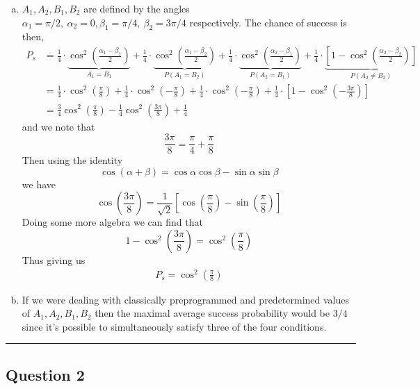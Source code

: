 \documentclass[11pt]{article}
\begin{document}
\begin{enumerate}[(a).]
  \item $A_1, A_2, B_1, B_2$ are defined by the angles $\alpha_1 = \pi/2, ~\alpha_2 = 0, \beta_1 = \pi/4, ~\beta_2 = 3\pi/4$ respectively. The chance of success is then,
  \begin{align*}
    P_s &= \frac{1}{4} \cdot \underbrace{\cos^2\left(\frac{\alpha_1 - \beta_1}{2}\right)}_{A_1 = B_1} + \frac{1}{4} \cdot \underbrace{ \cos^2\left(\frac{\alpha_1 - \beta_2}{2}\right)}_{P(A_1 = B_2)} + \frac{1}{4} \cdot \underbrace{\cos^2\left(\frac{\alpha_2 - \beta_1}{2}\right)}_{P(A_2 = B_1)} + \frac{1}{4} \cdot \underbrace{\left[1 - \cos^2\left(\frac{\alpha_2 - \beta_2}{2}\right)\right]}_{P(A_2 \neq B_2)} \\
    &= \frac{1}{4} \cdot \cos^2\left(\frac{\pi}{8}\right) + \frac{1}{4} \cdot \cos^2\left(-\frac{\pi}{8}\right) + \frac{1}{4} \cdot \cos^2\left(-\frac{\pi}{8}\right) + \frac{1}{4} \cdot \left[1 - \cos^2\left(-\frac{3\pi}{8}\right)\right] \\
    &= \frac{3}{4} \cos^2\left(\frac{\pi}{8}\right) - \frac{1}{4} \cos^2\left(\frac{3\pi}{8}\right) + \frac{1}{4}
  \end{align*} and we note that $$ \frac{3\pi}{8} = \frac{\pi}{4} + \frac{\pi}{8} $$ Then using the identity $$ \cos(\alpha + \beta) = \cos\alpha \cos \beta - \sin\alpha \sin \beta $$ we have $$ \cos(\frac{3\pi}{8}) = \frac{1}{\sqrt{2}} \left[\cos\left(\frac{\pi}{8}\right) - \sin\left(\frac{\pi}{8}\right)\right] $$ Doing some more algebra we can find that $$  1 - \cos^2\left(\frac{3\pi}{8}\right) = \cos^2\left(\frac{\pi}{8}\right) $$ Thus giving us 
  \begin{align*}
  \boxed{    P_s = \cos^2\left(\frac{\pi}{8}\right)} 
  \end{align*}

  \item If we were dealing with classically preprogrammed and predetermined values of $A_1, A_2, B_1, B_2$ then the maximal average success probability would be $3/4$ since it's possible to simultaneously satisfy three of the four conditions.
\end{enumerate}



\vskip 1cm
\hrule
\pagebreak

\subsection*{Question 2}
\end{document}
